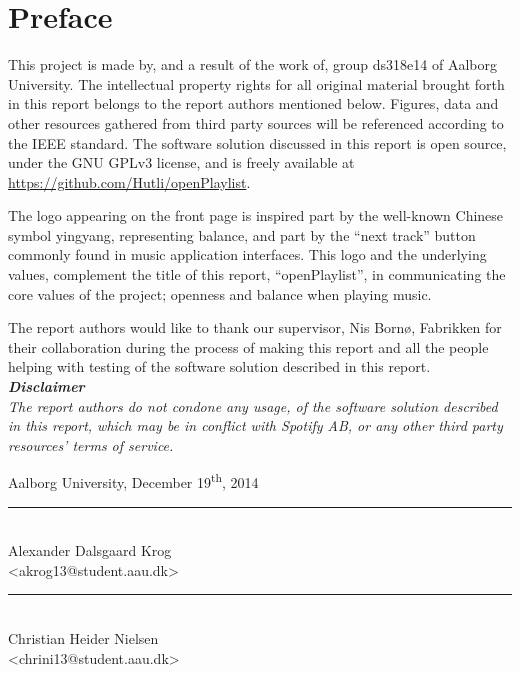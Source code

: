 \chapter*{Preface}\label{ch:preface}
 \thispagestyle{empty}
This project is made by, and a result of the work of, group ds318e14 of Aalborg University. The intellectual property rights for all original material brought forth in this report belongs to the report authors mentioned below. Figures, data and other resources gathered from third party sources will be referenced according to the IEEE standard. The software solution discussed in this report is open source, under the GNU GPLv3 license, and is freely available at \url{https://github.com/Hutli/openPlaylist}.

The logo appearing on the front page is inspired part by the well-known Chinese symbol yingyang, representing balance, and part by the \enquote{next track} button commonly found in music application interfaces. This logo and the underlying values, complement the title of this report, \enquote{openPlaylist}, in communicating the core values of the project; openness and balance when playing music.

The report authors would like to thank our supervisor, Nis Bornø, Fabrikken for their collaboration during the process of making this report and all the people helping with testing
of the software solution described in this report.\\

\noindent
\textit{
\textbf{Disclaimer}\\
The report authors do not condone any usage, of the software solution described in this report, which may be in conflict with Spotify AB, or any other third party resources' terms of service.}

\vspace{\baselineskip}\hfill Aalborg University, December 19\textsuperscript{th}, 2014
\vfill

\noindent
\begin{minipage}[b]{0.45\textwidth}
 \centering
 \rule{\textwidth}{0.5pt}\\
  Alexander Dalsgaard Krog\\
 {\footnotesize <akrog13@student.aau.dk>}
\end{minipage}
\hfill
\begin{minipage}[b]{0.45\textwidth}
 \centering
 \rule{\textwidth}{0.5pt}\\
  Christian Heider Nielsen\\
 {\footnotesize <chrini13@student.aau.dk>}
\end{minipage}
\vspace{3\baselineskip}

